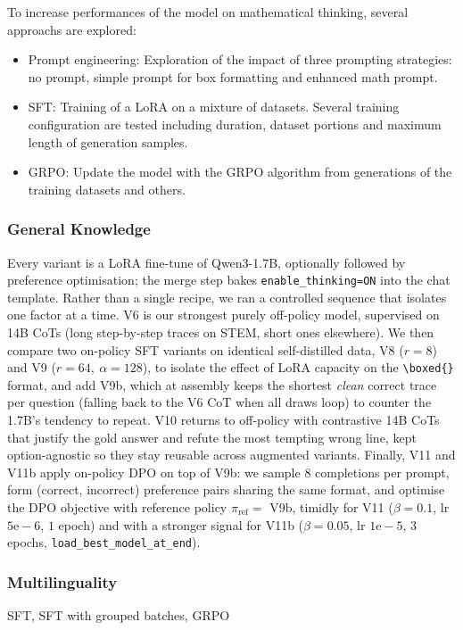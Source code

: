 \documentclass[11pt]{article}
\begin{document}
    To increase performances of the model on mathematical thinking, several approachs are explored:
    
    \begin{itemize}
        \item Prompt engineering: Exploration of the impact of three prompting strategies: no prompt, simple prompt for box formatting and enhanced math prompt.
        \item SFT: Training of a LoRA on a mixture of datasets. Several training configuration are tested including duration, dataset portions and maximum length of generation samples. 
        \item GRPO: Update the model with the GRPO algorithm from generations of the training datasets and others.
    \end{itemize}

    
\subsubsection{General Knowledge}

    Every variant is a LoRA fine-tune of Qwen3-1.7B, optionally followed by preference optimisation; the merge step bakes \texttt{enable\_thinking=ON} into the chat template. Rather than a single recipe, we ran a controlled sequence that isolates one factor at a time. V6 is our strongest purely off-policy model, supervised on 14B CoTs (long step-by-step traces on STEM, short ones elsewhere). We then compare two on-policy SFT variants on identical self-distilled data, V8 ($r{=}8$) and V9 ($r{=}64,\ \alpha{=}128$), to isolate the effect of LoRA capacity on the \texttt{\textbackslash boxed\{\}} format, and add V9b, which at assembly keeps the shortest \emph{clean} correct trace per question (falling back to the V6 CoT when all draws loop) to counter the 1.7B's tendency to repeat. V10 returns to off-policy with contrastive 14B CoTs that justify the gold answer and refute the most tempting wrong line, kept option-agnostic so they stay reusable across augmented variants. Finally, V11 and V11b apply on-policy DPO on top of V9b: we sample $8$ completions per prompt, form (correct, incorrect) preference pairs sharing the same format, and optimise the DPO objective with reference policy $\pi_{\text{ref}}=$ V9b, timidly for V11 ($\beta{=}0.1$, lr $5\mathrm{e}{-}6$, $1$ epoch) and with a stronger signal for V11b ($\beta{=}0.05$, lr $1\mathrm{e}{-}5$, $3$ epochs, \texttt{load\_best\_model\_at\_end}).


\subsubsection{Multilinguality}
SFT, SFT with grouped batches, GRPO
\end{document}
